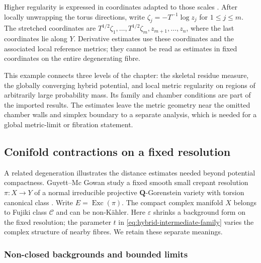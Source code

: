 Higher regularity is expressed in coordinates adapted to those scales
\cite[Section~2.4, Corollary~5.1 and the proof of Theorem~1.1]{LT26Intermediate}.
After locally unwrapping the torus directions, write
$\zeta_j=-T^{-1}\log z_j$ for $1\leq j\leq m$. The stretched coordinates
are $T^{1/2}\zeta_1,\ldots,T^{1/2}\zeta_m,z_{m+1},\ldots,z_n$,
where the last coordinates lie along $Y$. Derivative estimates use these
coordinates and the associated local reference metrics; they cannot be
read as estimates in fixed coordinates on the entire degenerating fibre.

This example connects three levels of the chapter: the skeletal residue
measure, the globally converging hybrid potential, and local metric
regularity on regions of arbitrarily large probability mass. Its family
and chamber conditions are part of the imported results. The estimates
leave the metric geometry near the omitted chamber walls and simplex
boundary to a separate analysis, which is needed for a global metric-limit
or fibration statement.

\subsection{Conifold contractions on a fixed resolution}
\label{sec:hybrid-conifold-contractions}

A related degeneration illustrates the distance estimates needed beyond
potential compactness. Guyett--Mc Gowan study a fixed smooth small
crepant resolution $\pi:X\to Y$ of a normal irreducible projective
$\mathbf Q$-Gorenstein variety with torsion canonical class
\cite[Theorems~1.1--1.2]{GuyettMcGowan26ConifoldV1}.
Write $E=\operatorname{Exc}(\pi)$. The compact complex manifold $X$
belongs to Fujiki class $\mathcal C$ and can be non-K\"ahler.
Here $\varepsilon$ shrinks a background form on the fixed resolution;
the parameter $t$ in \eqref{eq:hybrid-intermediate-family} varies the
complex structure of nearby fibres. We retain these separate meanings.

\subsubsection{Non-closed backgrounds and bounded limits}


